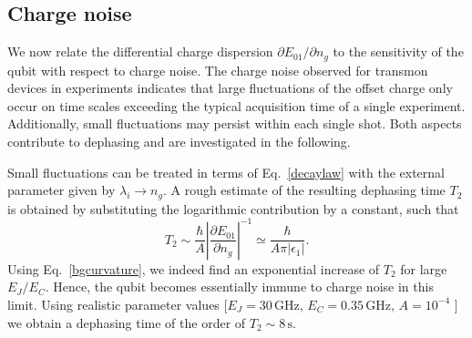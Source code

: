 \documentclass[twocolumn,amsmath,amssymb,floatfix,pra,showpacs,eqsecnum,footinbib,superscriptaddress]{revtex4}
\newcommand{\abs}[1]{\left|#1\right|}
\newcommand{\be}{\begin{equation}}
\newcommand{\ee}{\end{equation}}
\begin{document}
\subsection{Charge noise}
We now relate the differential charge dispersion $\partial E_{01}/\partial n_g$  to the sensitivity of the qubit with respect to charge noise. 
The charge noise observed for transmon devices in experiments \cite{houck2} indicates that large fluctuations of the offset charge only occur on time scales exceeding the typical acquisition time of a single experiment. Additionally, small fluctuations may persist within each single shot. Both aspects contribute to dephasing and are investigated in the following.


Small fluctuations can be treated in terms of Eq.~\eqref{decaylaw} with the external parameter given by $\lambda_i\to n_g$.  A rough estimate of the resulting dephasing time $T_2$ is obtained by substituting the logarithmic contribution by a constant, such that 
\be\label{charget2}
T_2\sim \frac{\hbar}{A}\abs{ \frac{\partial E_{01}}{\partial n_g}}^{-1}\simeq\frac{\hbar}{A\pi\abs{\epsilon_1}}.
\ee
Using Eq.~\eqref{bgcurvature}, we indeed find an exponential increase of $T_2$ for large $E_J/E_C$. Hence, the qubit becomes essentially immune to charge noise in this limit. Using realistic parameter values [$E_J=30\,\text{GHz}$, $E_C=0.35\,\text{GHz}$, $A=10^{-4}$ \cite{zorin}] we obtain a dephasing time of the order of $T_2\sim8\,\text{s}$.
\end{document}

